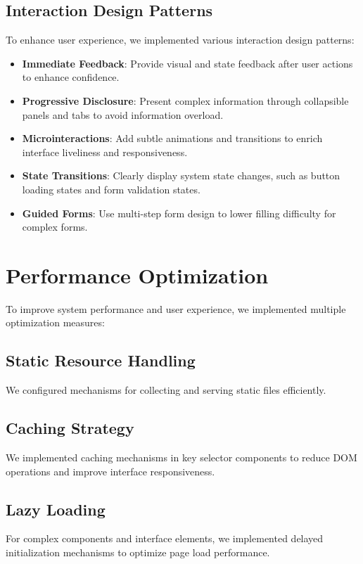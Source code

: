 \subsection{Interaction Design Patterns}
To enhance user experience, we implemented various interaction design patterns:
\begin{itemize}
    \item \textbf{Immediate Feedback}: Provide visual and state feedback after user actions to enhance confidence.
    \item \textbf{Progressive Disclosure}: Present complex information through collapsible panels and tabs to avoid information overload.
    \item \textbf{Microinteractions}: Add subtle animations and transitions to enrich interface liveliness and responsiveness.
    \item \textbf{State Transitions}: Clearly display system state changes, such as button loading states and form validation states.
    \item \textbf{Guided Forms}: Use multi-step form design to lower filling difficulty for complex forms.
\end{itemize}


\section{Performance Optimization}

To improve system performance and user experience, we implemented multiple optimization measures:

\subsection{Static Resource Handling}
We configured mechanisms for collecting and serving static files efficiently.

\subsection{Caching Strategy}
We implemented caching mechanisms in key selector components to reduce DOM operations and improve interface responsiveness.

\subsection{Lazy Loading}
For complex components and interface elements, we implemented delayed initialization mechanisms to optimize page load performance.

